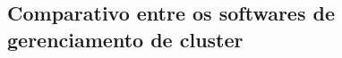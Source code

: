 % 

\subsection{Comparativo entre os softwares de gerenciamento de cluster}
\label{section:gerenciadorescolhido}


